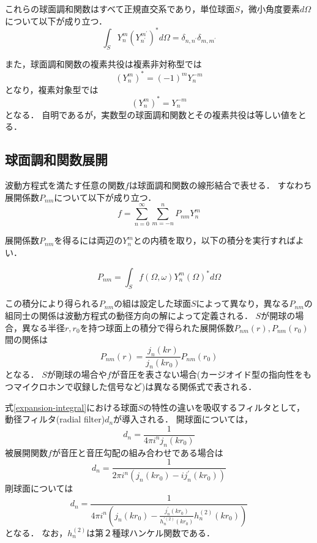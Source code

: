 \documentclass[a4paper]{jsarticle}
\begin{document}
これらの球面調和関数はすべて正規直交系であり，単位球面$S$，微小角度要素$d\Omega$について以下が成り立つ．
$$
    \int_{S} Y_{n}^{m}\left(Y_{n^{\prime}}^{m^{\prime}}\right)^{*} d \Omega=\delta_{n, n^{\prime}} \delta_{m, m^{\prime}}
$$

また，球面調和関数の複素共役は複素非対称型では
$$
    \left(Y_{n}^{m}\right)^{*}=(-1)^{m} Y_{n}^{-m}
$$
となり，複素対象型では
$$
    \left(Y_{n}^{m}\right)^{*}=Y_{n}^{-m}
$$
となる．
自明であるが，実数型の球面調和関数とその複素共役は等しい値をとる．

\subsection{球面調和関数展開}
波動方程式を満たす任意の関数$f$は球面調和関数の線形結合で表せる．
すなわち展開係数$P_{nm}$について以下が成り立つ．
\begin{equation}
    \label{spherical-expansion}
    f=\sum_{n=0}^{\infty} \sum_{m=-n}^{n} P_{n m} Y_{n}^{m}
\end{equation}

展開係数$P_{nm}$を得るには両辺の$Y_{n}^{m}$との内積を取り，以下の積分を実行すればよい．

\begin{equation}
    \label{expansion-integral}
    P_{n m}=\int_{S} f(\Omega, \omega) Y_{n}^{m}(\Omega)^{*} d \Omega
\end{equation}

この積分により得られる$P_{nm}$の組は設定した球面$S$によって異なり，異なる$P_{nm}$の組同士の関係は波動方程式の動径方向の解によって定義される．
$S$が開球の場合，異なる半径$r, r_0$を持つ球面上の積分で得られた展開係数$P_{nm}(r), P_{nm}(r_0)$間の関係は
$$
    P_{n m}(r)=\frac{j_{n}(k r)}{j_{n}\left(k r_{0}\right)} P_{n m}\left(r_{0}\right)
$$
となる\cite{EGW99}．
$S$が剛球の場合や$f$が音圧を表さない場合(カージオイド型の指向性をもつマイクロホンで収録した信号など)は異なる関係式で表される．

式\ref{expansion-integral}における球面$S$の特性の違いを吸収するフィルタとして，動径フィルタ(radial filter)$d_n$が導入される．
開球面については，
$$
    d_{n}=\frac{1}{4 \pi i^{n} j_{n}\left(k r_{0}\right)}
$$
被展開関数$f$が音圧と音圧勾配の組み合わせである場合は
$$
    d_{n}=\frac{1}{2 \pi i^{n}\left(j_{n}\left(k r_{0}\right)-i j_{n}^{\prime}\left(k r_{0}\right)\right)}
$$
剛球面については
$$
    d_{n}=\frac{1}{4 \pi i^{n}\left(j_{n}\left(k r_{0}\right)-\frac{j_{n}^{\prime}\left(k r_{0}\right)}{h_{n}^{\prime(2)}\left(k r_{0}\right)} h_{n}^{(2)}\left(k r_{0}\right)\right)}
$$
となる．
なお，$h_{n}^{(2)}$は第２種球ハンケル関数である．
\end{document}
